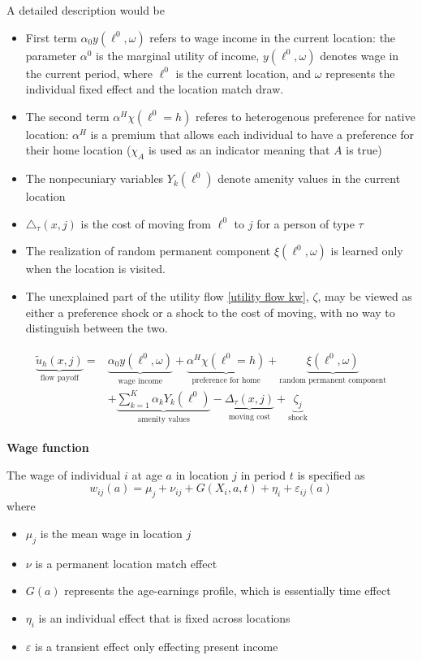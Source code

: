 \documentclass{article}
\numberwithin{equation}{section} %
\begin{document}
A detailed description would be
\begin{itemize}
  \item First term $\alpha_0 y(\ell^0, \omega)$ refers to wage income in the current location: the parameter $\alpha^0$ is the  marginal utility of income, $y(\ell^0,\omega)$ denotes wage in the current period, where $\ell^0$ is the current location, and $\omega$ represents the individual fixed effect and the location match draw. 
  \item The second term $\alpha^H \chi(\ell^0 = h)$ referes to heterogenous preference for native location: $\alpha^H$ is a premium that allows each individual to have a preference for their home location ($\chi_A$ is used as an indicator meaning that  $A$ is true)
  \item The nonpecuniary variables $Y_k(\ell^0)$ denote amenity values in the current location
  \item $\triangle_\tau(x,j)$ is the cost of moving from $\ell^0$ to $j$ for a person of type $\tau$
  \item The realization of random permanent component $\xi(\ell^0,\omega)$ is learned only when the location is visited.
  \item The unexplained part of the utility flow \ref{utility flow kw}, $\zeta$, may be viewed as either a preference shock or a shock to the cost of moving, with no way to distinguish between the two.
\end{itemize}
\begin{align}
\begin{split}
  \underbrace{\tilde u_h(x,j)}_{\text{flow payoff}}=&\underbrace{\alpha_0 y(\ell^0, \omega)}_{\text{wage income}} + \underbrace{\alpha^H \chi(\ell^0 = h)}_{\text{preference for home}}+\underbrace{\xi(\ell^0,\omega)}_{\text{random permanent component}}
  \\&+ \underbrace{\sum_{k=1}^K \alpha_k Y_k(\ell^0)}_{\text{amenity values}} - \underbrace{\Delta_\tau(x, j)}_{\text{moving cost}}+\underbrace{\zeta_j}_{\text{shock}}
\end{split}
\end{align}


\textbf{Wage function}

The wage of individual $i$ at age $a$ in location $j$ in period $t$ is specified as
\begin{equation}
  w_{ij}(a)=\mu_j+\nu_{ij}+G(X_i,a,t)+\eta_i+\varepsilon_{ij}(a)
\end{equation}
where 
\begin{itemize}
  \item $\mu_j$ is the mean wage in location $j$
  \item $\nu$ is a permanent location match effect
  \item $G(a)$ represents the age-earnings profile, which is essentially time effect
  \item $\eta_i$ is an individual effect that is fixed  across locations
  \item $\varepsilon$ is a transient effect only effecting present income
\end{itemize}
\end{document}
